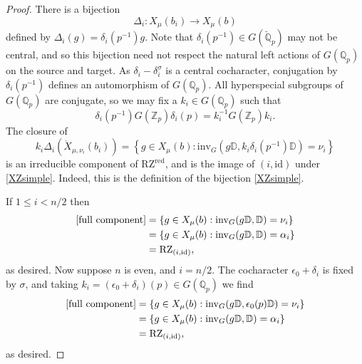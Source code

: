 \documentclass[11pt]{alggeom}
\newcommand{\red}{\mathrm{red}}
\newcommand{\Q}{\mathbb Q}
\newcommand{\Z}{\mathbb Z}
\begin{document}
\begin{proof}
There is a bijection
\[
\Delta_i : X_\mu(b_i)  \to  X_\mu(b) 
\]
defined by $\Delta_i(g)  = \delta_i(p^{-1}) g$.  
Note  that $\delta_i(p^{-1}) \in G(\breve{\Q}_p)$ may not be central, and so this  bijection  need not respect the natural left actions of $G(\Q_p)$ on the source and target.
As $\delta_i-\delta_i^\sigma$ is a central cocharacter,  conjugation by $\delta_i(p^{-1})$ defines an automorphism of $G(\Q_p)$.
All hyperspecial subgroups of $G(\Q_p)$ are conjugate, so we may fix  a $k_i \in G(\Q_p)$ such that 
\begin{equation}\label{conj stabilizer}
\delta_i(p^{-1}) G(\Z_p) \delta_i(p) = k_i^{-1} G(\Z_p) k_i .
\end{equation}
The closure  of 
\begin{equation}\label{full component}
  k_i \Delta_i( \mathring{X}_{\mu,\nu_i}(b_i) )      =   \left\{ g\in X_\mu(b)  :  \mathrm{inv}_G( g \mathbb{D} ,  k_i  \delta_i(p^{-1}) \mathbb{D} ) = \nu_i  \right\} 
\end{equation}
 is an irreducible component of $\mathrm{RZ}^\red$, and is the image of $(i,\mathrm{id})$ under \eqref{XZsimple}.  Indeed, this is the definition of the bijection \eqref{XZsimple}.
 
 
 
If $1\le i <n/2$ then
\begin{align*}
 \eqref{full component}  
 &=    \left\{ g \in X_\mu(b) :  \mathrm{inv}_G( g \mathbb{D} , \mathbb{D} ) 
  = \nu_i \right\}  \\
  & =   \left\{ g \in X_\mu(b) :  \mathrm{inv}_G( g \mathbb{D} , \mathbb{D} ) = \alpha_i \right\}  \\
  &= \mathrm{RZ}_{(i,\mathrm{id})},
\end{align*}
as desired.
Now suppose $n$ is even, and  $i=n/2$.  The cocharacter $\epsilon_0+\delta_i$ is fixed by $\sigma$, and taking
$
k_i = (\epsilon_0+\delta_i)(p) \in G(\Q_p)
$
we find 
\begin{align*}
 \eqref{full component}  
 &=    \left\{ g\in X_\mu(b)  :  \mathrm{inv}_G( g \mathbb{D} ,  \epsilon_0 (p) \mathbb{D} ) = \nu_i  \right\}   \\
  & =  \left\{ g\in X_\mu(b)  :  \mathrm{inv}_G( g \mathbb{D} ,   \mathbb{D} ) = \alpha_i  \right\} \\
  &= \mathrm{RZ}_{(i,\mathrm{id})},
\end{align*}
as desired.
\end{proof}
\end{document}
